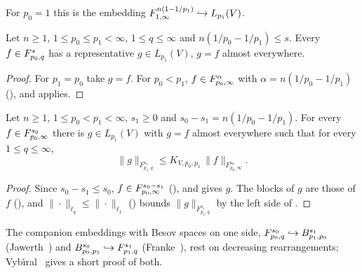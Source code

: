 For $p_0 = 1$ this is the embedding $F^{n(1 - 1/p_1)}_{1,\infty} \hookrightarrow L_{p_1}(V)$.

\begin{corollary}
\label{cor:triebel-lizorkin-into-lp-le}
\leanok
{}
Let $n \geq 1$, $1 \leq p_0 \leq p_1 < \infty$, $1 \leq q \leq \infty$ and
$n(1/p_0 - 1/p_1) \leq s$. Every $f \in F^{s}_{p_0,q}$ has a representative $g \in L_{p_1}(V)$,
$g = f$ almost everywhere.
\end{corollary}

\begin{proof}
\leanok
For $p_1 = p_0$ take $g = f$. For $p_0 < p_1$, $f \in F^{\alpha}_{p_0,\infty}$ with
$\alpha = n(1/p_0 - 1/p_1)$ (), and 
applies.
\end{proof}

\begin{theorem}
\label{thm:jawerth-embedding}
\leanok
{}
Let $n \geq 1$, $1 \leq p_0 < p_1 < \infty$, $s_1 \geq 0$ and $s_0 - s_1 = n(1/p_0 - 1/p_1)$.
For every $f \in F^{s_0}_{p_0,\infty}$ there is $g \in L_{p_1}(V)$ with $g = f$ almost
everywhere such that for every $1 \leq q \leq \infty$,
\[
  \|g\|_{F^{s_1}_{p_1,q}} \leq K_{V,p_0,p_1} \, \|f\|_{F^{s_0}_{p_0,\infty}} .
\]
\end{theorem}

\begin{proof}
\leanok
Since $s_0 - s_1 \leq s_0$, $f \in F^{s_0 - s_1}_{p_0,\infty}$ (), and
 gives $g$. The blocks of $g$ are those of $f$
(), and
$\|\cdot\|_{\ell_q} \leq \|\cdot\|_{\ell_1}$ () bounds
$\|g\|_{F^{s_1}_{p_1,q}}$ by the left side of .
\end{proof}

The companion embeddings with Besov spaces on one side,
$F^{s_0}_{p_0,q} \hookrightarrow B^{s_1}_{p_1,p_0}$ (Jawerth~\cite{Jawerth1977}) and
$B^{s_0}_{p_0,p_1} \hookrightarrow F^{s_1}_{p_1,q}$ (Franke~\cite{Franke1986}), rest on
decreasing rearrangements; Vyb\'{\i}ral~\cite{VybiralJF2008} gives a short proof of both.

